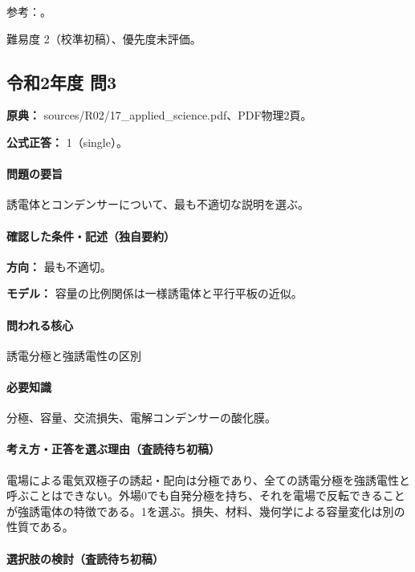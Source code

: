 \par 参考：\cite{mit_em03}。

\par 難易度 2（校準初稿）、優先度未評価。

\subsection{令和2年度 問3}
\label{q:r02-reg-applied-03}

\noindent\textbf{原典：} sources/R02/17\_applied\_science.pdf、PDF物理2頁。

\textbf{公式正答：} 1（single）。

\paragraph{問題の要旨} 誘電体とコンデンサーについて、最も不適切な説明を選ぶ。

\paragraph{確認した条件・記述（独自要約）}\mbox{}\par

\noindent\textbf{方向：} 最も不適切。\par

\noindent\textbf{モデル：} 容量の比例関係は一様誘電体と平行平板の近似。\par

\paragraph{問われる核心} 誘電分極と強誘電性の区別

\paragraph{必要知識} 分極、容量、交流損失、電解コンデンサーの酸化膜。

\paragraph{考え方・正答を選ぶ理由（査読待ち初稿）} 電場による電気双極子の誘起・配向は分極であり、全ての誘電分極を強誘電性と呼ぶことはできない。外場0でも自発分極を持ち、それを電場で反転できることが強誘電体の特徴である。1を選ぶ。損失、材料、幾何学による容量変化は別の性質である。

\paragraph{選択肢の検討（査読待ち初稿）}\mbox{}\par

